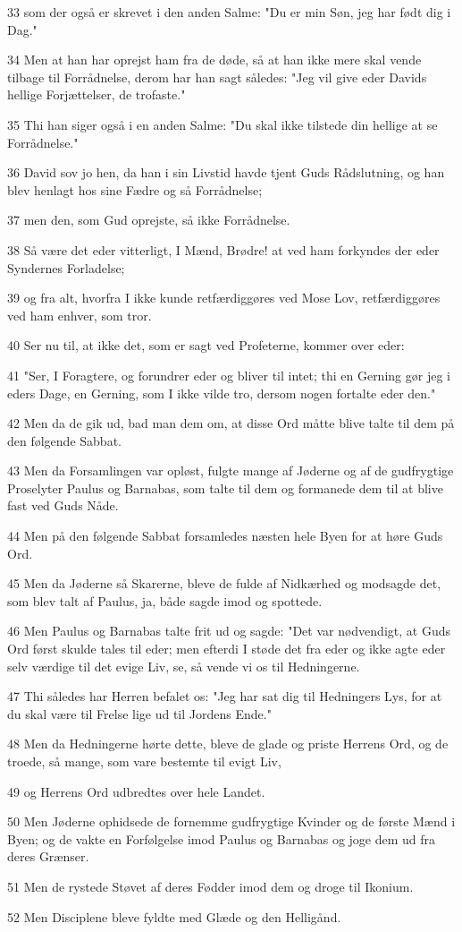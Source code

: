 \par 33 som der også er skrevet i den anden Salme: "Du er min Søn, jeg har født dig i Dag."
\par 34 Men at han har oprejst ham fra de døde, så at han ikke mere skal vende tilbage til Forrådnelse, derom har han sagt således: "Jeg vil give eder Davids hellige Forjættelser, de trofaste."
\par 35 Thi han siger også i en anden Salme: "Du skal ikke tilstede din hellige at se Forrådnelse."
\par 36 David sov jo hen, da han i sin Livstid havde tjent Guds Rådslutning, og han blev henlagt hos sine Fædre og så Forrådnelse;
\par 37 men den, som Gud oprejste, så ikke Forrådnelse.
\par 38 Så være det eder vitterligt, I Mænd, Brødre! at ved ham forkyndes der eder Syndernes Forladelse;
\par 39 og fra alt, hvorfra I ikke kunde retfærdiggøres ved Mose Lov, retfærdiggøres ved ham enhver, som tror.
\par 40 Ser nu til, at ikke det, som er sagt ved Profeterne, kommer over eder:
\par 41 "Ser, I Foragtere, og forundrer eder og bliver til intet; thi en Gerning gør jeg i eders Dage, en Gerning, som I ikke vilde tro, dersom nogen fortalte eder den."
\par 42 Men da de gik ud, bad man dem om, at disse Ord måtte blive talte til dem på den følgende Sabbat.
\par 43 Men da Forsamlingen var opløst, fulgte mange af Jøderne og af de gudfrygtige Proselyter Paulus og Barnabas, som talte til dem og formanede dem til at blive fast ved Guds Nåde.
\par 44 Men på den følgende Sabbat forsamledes næsten hele Byen for at høre Guds Ord.
\par 45 Men da Jøderne så Skarerne, bleve de fulde af Nidkærhed og modsagde det, som blev talt af Paulus, ja, både sagde imod og spottede.
\par 46 Men Paulus og Barnabas talte frit ud og sagde: "Det var nødvendigt, at Guds Ord først skulde tales til eder; men efterdi I støde det fra eder og ikke agte eder selv værdige til det evige Liv, se, så vende vi os til Hedningerne.
\par 47 Thi således har Herren befalet os: "Jeg har sat dig til Hedningers Lys, for at du skal være til Frelse lige ud til Jordens Ende."
\par 48 Men da Hedningerne hørte dette, bleve de glade og priste Herrens Ord, og de troede, så mange, som vare bestemte til evigt Liv,
\par 49 og Herrens Ord udbredtes over hele Landet.
\par 50 Men Jøderne ophidsede de fornemme gudfrygtige Kvinder og de første Mænd i Byen; og de vakte en Forfølgelse imod Paulus og Barnabas og joge dem ud fra deres Grænser.
\par 51 Men de rystede Støvet af deres Fødder imod dem og droge til Ikonium.
\par 52 Men Disciplene bleve fyldte med Glæde og den Helligånd.

